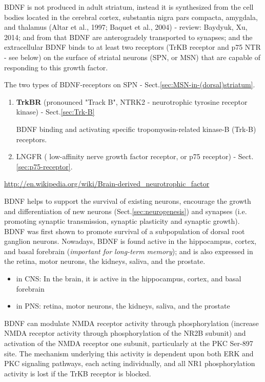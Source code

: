 BDNF is not produced in adult striatum, instead it is synthesized  from the cell
bodies located in the cerebral cortex, substantia nigra pars compacta, amygdala,
and thalamus (Altar et al., 1997; Baquet et al., 2004) - review: Baydyuk, Xu,
2014; and from that BDNF are anterogradely transported to synapses; and the
extracellular BDNF binds to at least two receptors (TrKB receptor and p75 NTR -
see below) on the surface of striatal neurons (SPN, or MSN) that are capable of
responding to this growth factor.

The two types of BDNF-receptors on SPN - Sect.\ref{sec:MSN-in-(dorsal)striatum}.
\begin{enumerate}
  \item {\bf TrkBR} (pronounced "Track B", NTRK2 - neurotrophic tyrosine
  receptor kinase) - Sect.\ref{sec:Trk-B}
  
  BDNF binding and activating specific tropomyosin-related kinase-B (Trk-B)
  receptors.

  \item LNGFR ( low-affinity nerve growth factor receptor, or p75 receptor) -
  Sect.\ref{sec:p75-receptor}.
\end{enumerate}
\url{http://en.wikipedia.org/wiki/Brain-derived_neurotrophic_factor}

BDNF helps to support the survival of existing neurons, encourage the growth and
differentiation of new neurons (Sect.\ref{sec:neurogenesis}) and synapses (i.e.
promoting synaptic transmission, synaptic plasticity and synaptic growth).
BDNF was first  shown to promote survival of a subpopulation of dorsal root
ganglion neurons. Nowadays, BDNF is found active in the hippocampus, cortex, and
basal forebrain ({\it important for long-term memory}); and is also expressed in
the retina, motor neurons, the kidneys, saliva, and the prostate.
\begin{itemize}
  \item in CNS: In the brain, it is active in the hippocampus, cortex, and basal
  forebrain
  
  \item in PNS: retina, motor neurons, the kidneys, saliva, and the prostate
\end{itemize}

BDNF can modulate NMDA receptor activity  through phosphorylation (increase NMDA
receptor activity through phosphorylation of the NR2B subunit) and activation of
the NMDA receptor one subunit, particularly at the PKC Ser-897 site.
The mechanism underlying this activity is dependent upon both ERK and PKC
signaling pathways, each acting individually, and all NR1 phosphorylation
activity is lost if the TrKB receptor is blocked.


